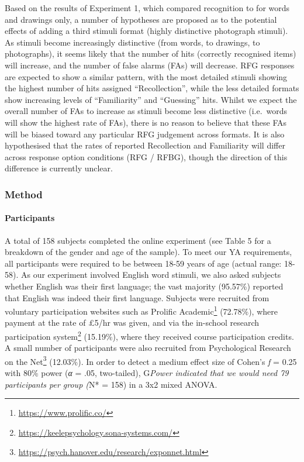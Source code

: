 \documentclass[
  11pt,
]{article}
\begin{document}
Based on the results of Experiment 1, which compared recognition to for
words and drawings only, a number of hypotheses are proposed as to the
potential effects of adding a third stimuli format (highly distinctive
photograph stimuli). As stimuli become increasingly distinctive (from
words, to drawings, to photographs), it seems likely that the number of
hits (correctly recognised items) will increase, and the number of false
alarms (FAs) will decrease. RFG responses are expected to show a similar
pattern, with the most detailed stimuli showing the highest number of
hits assigned ``Recollection'', while the less detailed formats show
increasing levels of ``Familiarity'' and ``Guessing'' hits. Whilst we
expect the overall number of FAs to increase as stimuli become less
distinctive (i.e.~words will show the highest rate of FAs), there is no
reason to believe that these FAs will be biased toward any particular
RFG judgement across formats. It is also hypothesised that the rates of
reported Recollection and Familiarity will differ across response option
conditions (RFG / RFBG), though the direction of this difference is
currently unclear.

\hypertarget{method-2}{%
\subsubsection{Method}\label{method-2}}

\hypertarget{participants-2}{%
\paragraph{Participants}\label{participants-2}}

A total of 158 subjects completed the online experiment (see Table 5 for
a breakdown of the gender and age of the sample). To meet our YA
requirements, all participants were required to be between 18-59 years
of age (actual range: 18-58). As our experiment involved English word
stimuli, we also asked subjects whether English was their first
language; the vast majority (95.57\%) reported that English was indeed
their first language. Subjects were recruited from voluntary
participation websites such as
Prolific Academic\footnote{\url{https://www.prolific.co/}} (72.78\%),
where payment at the rate of £5/hr was given, and via the in-school
research participation system\footnote{\url{https://keelepsychology.sona-systems.com/}}
(15.19\%), where they received course participation credits. A small
number of participants were also recruited from
Psychological Research on the Net\footnote{\url{https://psych.hanover.edu/research/exponnet.html}}
(12.03\%). In order to detect a medium effect size of Cohen's \emph{f} =
0.25 with 80\% power (\emph{α} = .05, two-tailed), G\emph{Power
indicated that we would need 79 participants per group (}N* = 158) in a
3x2 mixed ANOVA.
\end{document}
